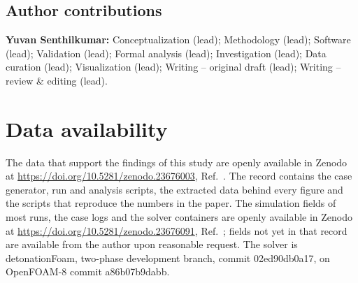 \documentclass[aip,pof,preprint,amsmath,amssymb]{revtex4-2}
\begin{document}
\subsection*{Author contributions}
\textbf{Yuvan Senthilkumar:} Conceptualization (lead); Methodology (lead); Software (lead); Validation (lead); Formal analysis (lead); Investigation (lead); Data curation (lead); Visualization (lead); Writing -- original draft (lead); Writing -- review \& editing (lead).

\section*{Data availability}
The data that support the findings of this study are openly available in Zenodo at \url{https://doi.org/10.5281/zenodo.23676003}, Ref.~. The record contains the case generator, run and analysis scripts, the extracted data behind every figure and the scripts that reproduce the numbers in the paper. The simulation fields of most runs, the case logs and the solver containers are openly available in Zenodo at \url{https://doi.org/10.5281/zenodo.23676091}, Ref.~; fields not yet in that record are available from the author upon reasonable request. The solver is detonationFoam, two-phase development branch, commit 02ed90db0a17, on OpenFOAM-8 commit a86b07b9dabb.
\end{document}
